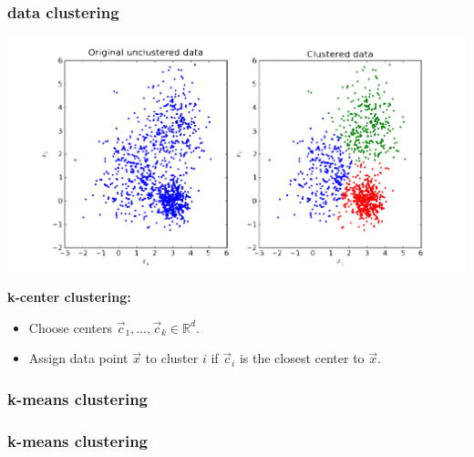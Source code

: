 \documentclass[handout,compress]{beamer}
\newcommand{\R}{\mathbb{R}}
\begin{document}
\begin{frame}
	\frametitle{data clustering}
	\begin{center}
		\includegraphics[width=.8\textwidth]{hardclustering.png}
	\end{center}
	\textbf{k-center clustering:}
	\begin{itemize}
		\item Choose centers $\vec{c}_1, \ldots, \vec{c}_k \in \R^d$. 
		\item Assign data point $\vec{x}$ to cluster $i$ if 
		$\vec{c}_i$ is the closest center to $\vec{x}$. 
	\end{itemize}
\end{frame}

\begin{frame}
	\frametitle{k-means clustering}
\end{frame}

\begin{frame}
	\frametitle{k-means clustering}
\end{frame}
\end{document}
